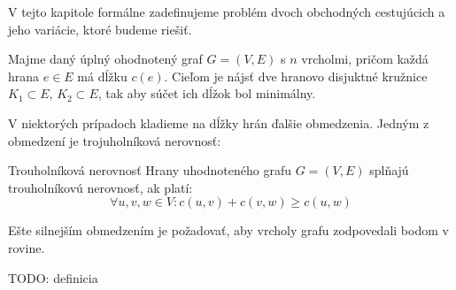 V tejto kapitole formálne zadefinujeme problém dvoch obchodných cestujúcich
a jeho variácie, ktoré budeme riešiť.

\begin{definicia}
Majme daný úplný ohodnotený graf $G = (V, E)$ s $n$ vrcholmi, pričom každá hrana
$e \in E$ má dĺžku $c(e)$. Cieľom je nájsť dve hranovo disjuktné kružnice $K_1 \subset E$,
$K_2 \subset E$, tak aby súčet ich dĺžok bol minimálny.
\end{definicia}

V niektorých prípadoch kladieme na dĺžky hrán ďalšie obmedzenia.
Jedným z obmedzení je trojuholníková nerovnosť:

\begin{definicia}{Trouholníková nerovnosť}
Hrany uhodnoteného grafu $G = (V, E)$ splňajú trouholníkovú nerovnosť, ak platí:
$$\forall u,v,w \in V: c(u,v) + c(v,w) \geq c(u,w)$$
\end{definicia}

Ešte silnejším obmedzením je požadovať, aby vrcholy grafu zodpovedali bodom v rovine.

TODO: definicia

